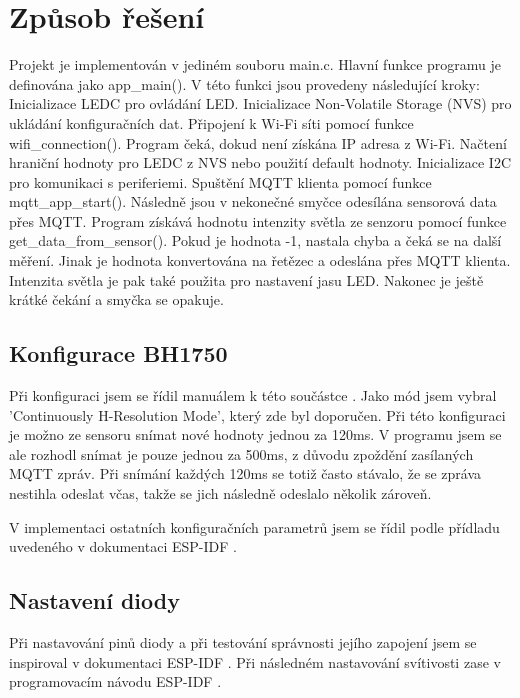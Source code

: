 \documentclass[a4paper, 11pt]{article}
\begin{document}
	\section{Způsob řešení}
            Projekt je implementován v jediném souboru main.c.
            Hlavní funkce programu je definována jako app\_main(). V této funkci jsou provedeny následující kroky:
            Inicializace LEDC pro ovládání LED.
            Inicializace Non-Volatile Storage (NVS) pro ukládání konfiguračních dat.
            Připojení k Wi-Fi síti pomocí funkce wifi\_connection(). Program čeká, dokud není získána IP adresa z 
            Wi-Fi.
            Načtení hraniční hodnoty pro LEDC z NVS nebo použití default hodnoty.
            Inicializace I2C pro komunikaci s periferiemi.
            Spuštění MQTT klienta pomocí funkce mqtt\_app\_start().
            Následně jsou v nekonečné smyčce odesílána sensorová data přes MQTT. Program získává hodnotu intenzity 
            světla ze senzoru pomocí funkce get\_data\_from\_sensor(). Pokud je hodnota -1, nastala chyba a čeká se na další měření. 
            Jinak je hodnota konvertována na řetězec a odeslána přes MQTT klienta. Intenzita světla je pak také použita pro nastavení jasu LED.
            Nakonec je ještě krátké čekání a smyčka se opakuje.
            

        \subsection{Konfigurace BH1750}
            Při konfiguraci jsem se řídil manuálem k této součástce \cite{sensor_svetla}. Jako mód jsem vybral
            'Continuously H-Resolution Mode', který zde byl doporučen. Při této konfiguraci je možno ze sensoru 
            snímat nové hodnoty jednou za 120ms. V programu jsem se ale rozhodl snímat je pouze jednou za 500ms,
            z důvodu zpoždění zasílaných MQTT zpráv. Při snímání každých 120ms se totiž často stávalo, že se
            zpráva nestihla odeslat včas, takže se jich následně odeslalo několik zároveň.

            V implementaci ostatních konfiguračních parametrů jsem se řídil podle přídladu uvedeného v dokumentaci
            ESP-IDF \cite{sensor_setup_example}.

        \subsection{Nastavení diody}
            Při nastavování pinů diody a při testování správnosti jejího zapojení jsem se inspiroval v 
            dokumentaci ESP-IDF \cite{led_blink}. Při následném nastavování svítivosti zase v programovacím
            návodu ESP-IDF \cite{led_control}. 
\end{document}
